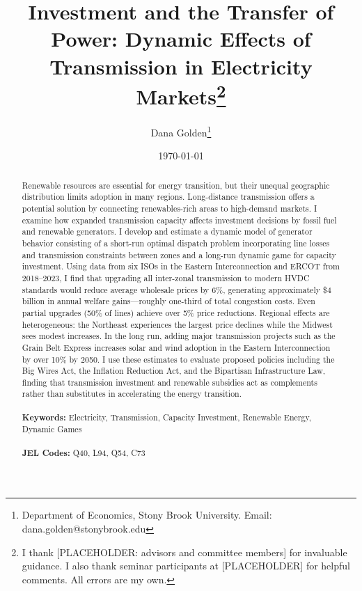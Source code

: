 \documentclass[12pt]{article}
\begin{document}
\begin{titlepage}
\title{Investment and the Transfer of Power: Dynamic Effects of Transmission in Electricity Markets\thanks{I thank [PLACEHOLDER: advisors and committee members] for invaluable guidance. I also thank seminar participants at [PLACEHOLDER] for helpful comments. All errors are my own.}}
\author{Dana Golden\thanks{Department of Economics, Stony Brook University. Email: dana.golden@stonybrook.edu}}
\date{\today}
\maketitle
\begin{abstract}
\noindent Renewable resources are essential for energy transition, but their unequal geographic distribution limits adoption in many regions. Long-distance transmission offers a potential solution by connecting renewables-rich areas to high-demand markets. I examine how expanded transmission capacity affects investment decisions by fossil fuel and renewable generators. I develop and estimate a dynamic model of generator behavior consisting of a short-run optimal dispatch problem incorporating line losses and transmission constraints between zones and a long-run dynamic game for capacity investment. Using data from six ISOs in the Eastern Interconnection and ERCOT from 2018--2023, I find that upgrading all inter-zonal transmission to modern HVDC standards would reduce average wholesale prices by 6\%, generating approximately \$4 billion in annual welfare gains---roughly one-third of total congestion costs. Even partial upgrades (50\% of lines) achieve over 5\% price reductions. Regional effects are heterogeneous: the Northeast experiences the largest price declines while the Midwest sees modest increases. In the long run, adding major transmission projects such as the Grain Belt Express increases solar and wind adoption in the Eastern Interconnection by over 10\% by 2050. I use these estimates to evaluate proposed policies including the Big Wires Act, the Inflation Reduction Act, and the Bipartisan Infrastructure Law, finding that transmission investment and renewable subsidies act as complements rather than substitutes in accelerating the energy transition.\\
\vspace{0in}\\
\noindent\textbf{Keywords:} Electricity, Transmission, Capacity Investment, Renewable Energy, Dynamic Games\\
\vspace{0in}\\
\noindent\textbf{JEL Codes:} Q40, L94, Q54, C73\\

\bigskip
\end{abstract}
\setcounter{page}{0}
\thispagestyle{empty}
\end{titlepage}
\pagebreak \newpage
\end{document}
